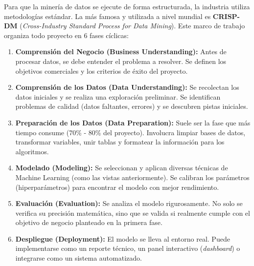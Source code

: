 Para que la minería de datos se ejecute de forma estructurada, la industria utiliza metodologías estándar. La más famosa y utilizada a nivel mundial es \textbf{CRISP-DM} (\textit{Cross-Industry Standard Process for Data Mining}). Este marco de trabajo organiza todo proyecto en 6 fases cíclicas:

\begin{enumerate}
    \item \textbf{Comprensión del Negocio (Business Understanding):} Antes de procesar datos, se debe entender el problema a resolver. Se definen los objetivos comerciales y los criterios de éxito del proyecto.
    
    \item \textbf{Comprensión de los Datos (Data Understanding):} Se recolectan los datos iniciales y se realiza una exploración preliminar. Se identifican problemas de calidad (datos faltantes, errores) y se descubren pistas iniciales.
    
    \item \textbf{Preparación de los Datos (Data Preparation):} Suele ser la fase que más tiempo consume (70\% - 80\% del proyecto). Involucra limpiar bases de datos, transformar variables, unir tablas y formatear la información para los algoritmos.
    
    \item \textbf{Modelado (Modeling):} Se seleccionan y aplican diversas técnicas de Machine Learning (como las vistas anteriormente). Se calibran los parámetros (hiperparámetros) para encontrar el modelo con mejor rendimiento.
    
    \item \textbf{Evaluación (Evaluation):} Se analiza el modelo rigurosamente. No solo se verifica su precisión matemática, sino que se valida si realmente cumple con el objetivo de negocio planteado en la primera fase.
    
    \item \textbf{Despliegue (Deployment):} El modelo se lleva al entorno real. Puede implementarse como un reporte técnico, un panel interactivo (\textit{dashboard}) o integrarse como un sistema automatizado.
\end{enumerate}